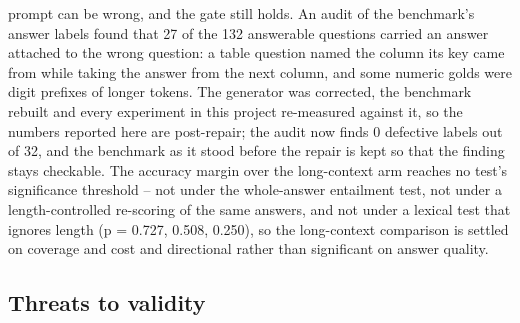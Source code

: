 \documentclass[preprint,3p,times]{elsarticle}
\begin{document}
prompt can be wrong, and the gate still holds. An audit of the benchmark's answer labels found that 27 of the 132 answerable questions carried an answer attached to the wrong question: a table question named the column its key came from while taking the answer from the next column, and some numeric golds were digit prefixes of longer tokens. The generator was corrected, the benchmark rebuilt and every experiment in this project re-measured against it, so the numbers reported here are post-repair; the audit now finds 0 defective labels out of 32, and the benchmark as it stood before the repair is kept so that the finding stays checkable. The accuracy margin over the long-context arm reaches no test's significance threshold -- not under the whole-answer entailment test, not under a length-controlled re-scoring of the same answers, and not under a lexical test that ignores length (p = 0.727, 0.508, 0.250), so the long-context comparison is settled on coverage and cost and directional rather than significant on answer quality.

\subsection{Threats to validity}
\end{document}
